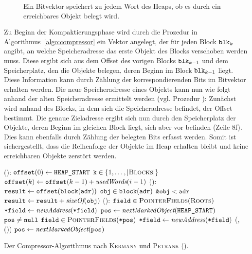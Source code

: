 \begin{figure}[h]
	\centering
	
	\caption[Bitvektor]{Ein Bitvektor speichert zu jedem Wort des Heaps, ob es durch ein erreichbares Objekt belegt wird.}
	\label{fig:bitvector}
\end{figure}

Zu Beginn der Kompaktierungsphase wird durch die Prozedur  in Algorithmus~\ref{algo:compressor} ein Vektor  angelegt, der für jeden Block $\texttt{blk}_k$ angibt, an welche Speicheradresse das erste Objekt des Blocks verschoben werden muss.
Diese ergibt sich aus dem Offset des vorigen Blocks $\texttt{blk}_{k-1}$ und dem Speicherplatz, den die Objekte belegen, deren Beginn im Block $\texttt{blk}_{k-1}$ liegt.
Diese Information kann durch Zählung der korrespondierenden Bits im Bitvektor erhalten werden.
Die neue Speicheradresse eines Objekts kann nun wie folgt anhand der alten Speicheradresse  ermittelt werden (vgl. Prozedur ):
Zunächst wird anhand des Blocks, in dem sich die Speicheradresse befindet, der Offset bestimmt.
Die genaue Zieladresse ergibt sich nun durch den Speicherplatz der Objekte, deren Beginn im gleichen Block liegt, sich aber vor  befinden (Zeile 8f).
Dies kann ebenfalls durch Zählung der belegten Bits erfasst werden.
Somit ist sichergestellt, dass die Reihenfolge der Objekte im Heap erhalten bleibt und keine erreichbaren Objekte zerstört werden.

\begin{algorithm}[h]
\begin{algorithmic}[1]
	\State {}():
	\State \quad $\texttt{offset}(0) \gets \texttt{HEAP\_START}$
	\State \quad \FOR $\texttt{k} \in \{1, \dots, \left\lvert\textsc{Blocks}\right\rvert\}$
	\State \quad \quad $\texttt{offset}(k) \gets \texttt{offset}(k-1) + \textit{usedWords}(i-1)$
	\Statex
	\State {}():
	\State \quad $\texttt{result} \gets \texttt{offset}(\texttt{block}(\texttt{adr}))$	
	\State \quad \FOREACH $\texttt{obj} \in \texttt{block}(\texttt{adr})$
	\State \quad \quad \IF $\texttt{\&obj} < \texttt{adr}$	
	\State \quad \quad \quad $\texttt{result} \gets \texttt{result} + \textit{sizeOf}(\texttt{obj})$
	\State \quad \Return {}
	\Statex
	\State {}():
	\State \quad \FOREACH $\texttt{field} \in \textsc{PointerFields}(\textsc{Roots})$
	\State \quad \quad $\texttt{*field} \gets \textit{newAddress}(\texttt{*field})$
	\State \quad $\texttt{pos} \gets \textit{nextMarkedObject}(\texttt{HEAP\_START})$
	\State \quad \WHILE $\texttt{pos} \neq \texttt{null}$	
	\State \quad \quad \FOREACH $\texttt{field} \in \textsc{PointerFields}(\texttt{*pos})$
	\State \quad \quad \quad $\texttt{*field} \gets \textit{newAddress}(\texttt{*field})$
	\State \quad \quad {}(, ())
	\State \quad \quad $\texttt{pos} \gets \textit{nextMarkedObject}(\texttt{pos})$
\end{algorithmic}
\caption[Compressor-Algorithmus]{Der Compressor-Algorithmus nach \textsc{Kermany} und \textsc{Petrank} (\cite{kermany2006}).}
\label{algo:compressor}
\end{algorithm}

